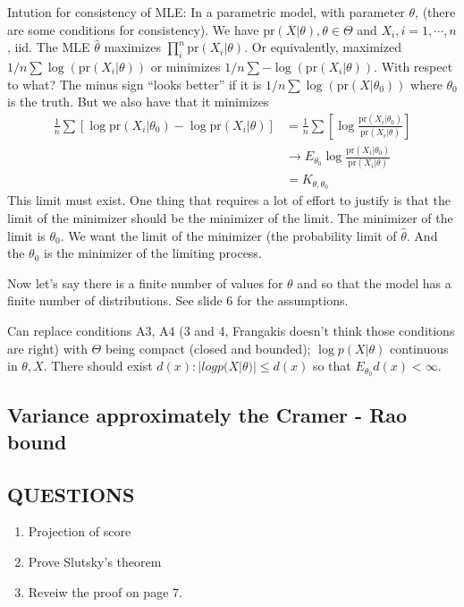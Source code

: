 \documentclass[letterpaper, 12pt]{article}
\theoremstyle{definition}
\theoremstyle{plain}
\newcommand{\pr}{\text{pr}}
\begin{document}
Intution for consistency of MLE: In a parametric model, with parameter $\theta$, (there are some conditions for consistency). We have $\pr (X | \theta) , \theta \in \Theta$ and $X_i, i = 1, \cdots, n$, iid. The MLE $\hat{\theta}$ maximizes $\prod_i^n \pr(X_i | \theta)$. Or equivalently, maximized $1/n \sum \log( \pr (X_i | \theta))$ or minimizes $ 1/n \sum -\log( \pr (X_i | \theta))$. With respect to what? The minus sign ``looks better'' if it is $1/n \sum \log(\pr(X | \theta_0))$ where $\theta_0$ is the truth. But we also have that it minimizes 
\begin{align}
\frac{1}{n} \sum [\log \pr(X_i | \theta_0) - \log \pr (X_i | \theta)] 
&= \frac{1}{n} \sum [\log \frac{\pr(X_i | \theta_0)}{\pr (X_i | \theta)}]  \\
&\to E_{\theta_0} \log \frac{\pr(X_i | \theta_0)}{\pr (X_i | \theta)} \\
&= K_{\theta, \theta_0}
\end{align}
 This limit must exist. One thing that requires a lot of effort to justify is that the limit of the minimizer should be the minimizer of the limit. The minimizer of the limit is $\theta_0$. We want the limit of the minimizer (the probability limit of $\hat{\theta}$. And the $\theta_0$ is the minimizer of the limiting process.
 
 Now let's say there is a finite number of values for $\theta$ and so that the model has a finite number of distributions. See slide 6 for the assumptions.
 
Can replace conditions A3, A4 (3 and 4, Frangakis doesn't think those conditions are right) with $\Theta$ being compact (closed and bounded); $\log p(X | \theta)$ continuous in $\theta, X$.
There should exist $d(x) : | log p(X | \theta) | \leq d(x)$ so that $E_{\theta_0} d(x) < \infty$.
\subsection*{Variance approximately the Cramer - Rao bound}

\subsection*{QUESTIONS}
\begin{enumerate}
\item
Projection of score
\item
Prove Slutsky's theorem
\item
Reveiw the proof on page 7.
\end{enumerate}
\end{document}
